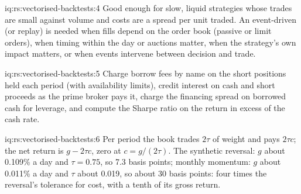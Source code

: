 \begin{solution}{iq:rs:vectorised-backtests:4}
Good enough for slow, liquid strategies whose trades are small against volume and costs are a spread per unit traded. An event-driven (or replay)  is
needed when fills depend on the order book (passive or limit orders), when timing within the day or auctions matter, when the strategy's own impact matters,
or when events intervene between decision and trade.
\end{solution}

\begin{solution}{iq:rs:vectorised-backtests:5}
Charge borrow fees by name on the short positions held each period (with availability limits), credit interest on cash and short proceeds as the prime broker
pays it, charge the financing spread on borrowed cash for leverage, and compute the Sharpe ratio on the return in excess of the cash rate.
\end{solution}

\begin{solution}{iq:rs:vectorised-backtests:6}
Per period the book trades $2\tau$ of weight and pays $2\tau c$; the net return is $g - 2\tau c$, zero at $c = g/(2\tau)$. The synthetic reversal: $g$ about
0.109\% a day and $\tau = 0.75$, so 7.3 basis points; monthly momentum: $g$ about 0.011\% a day and $\tau$ about 0.019, so about 30 basis points: four times the
reversal's tolerance for cost, with a tenth of its gross return.
\end{solution}
